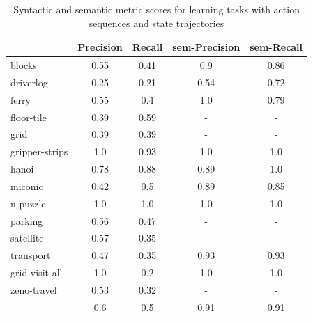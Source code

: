 \begin{table}[hbt!]
	\begin{center}		
		\begin{tabular}{l|c|c|c|c|}		
			& {\bf Precision} & {\bf Recall} & {\bf sem-Precision} & {\bf sem-Recall} \\
			\hline
			blocks & 0.55 & 0.41 & 0.9 & 0.86 \\
			driverlog & 0.25 & 0.21 & 0.54 & 0.72 \\
			ferry & 0.55 & 0.4 & 1.0 & 0.79 \\
			floor-tile & 0.39 & 0.59 & - & - \\
			grid & 0.39 & 0.39 & - & - \\
			gripper-strips & 1.0 & 0.93 & 1.0 & 1.0 \\
			hanoi & 0.78 & 0.88 & 0.89 & 1.0 \\
			miconic & 0.42 & 0.5 & 0.89 & 0.85 \\
			n-puzzle & 1.0 & 1.0 & 1.0 & 1.0 \\
			parking & 0.56 & 0.47 & - & - \\
			satellite & 0.57 & 0.35 & - & - \\
			transport & 0.47 & 0.35 & 0.93 & 0.93 \\
			grid-visit-all & 1.0 & 0.2 & 1.0 & 1.0 \\
			zeno-travel & 0.53 & 0.32 & - & - \\
			\hline
			& 0.6 & 0.5 & 0.91 & 0.91
		\end{tabular}
	\end{center}
	\caption{\small Syntactic and semantic metric scores for learning tasks with \NO action sequences and \NO state trajectories}
	\label{tab:metric_comparison_0_0}
\end{table}




